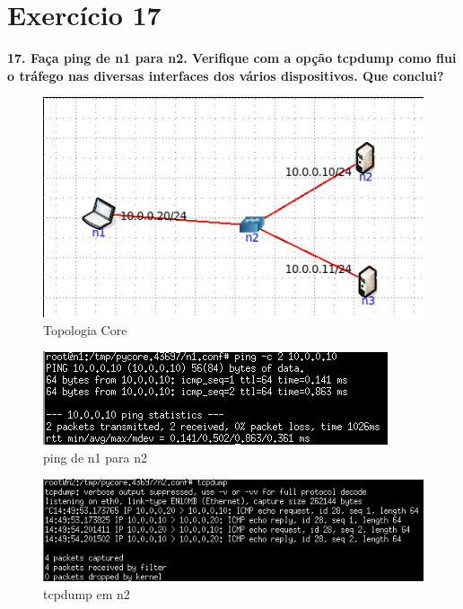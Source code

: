 \documentclass[a4paper]{report}
\begin{document}
\section{Exercício 17}
\textbf{17. Faça ping de n1 para n2. Verifique com a opção tcpdump como flui o
tráfego nas diversas interfaces dos vários dispositivos. Que conclui?}
\begin{figure}[H]
    \centering 
    \includegraphics[width=\textwidth]{images/ex17topologiacore.png}
    \caption{Topologia Core}
    \label{fig:ex17topologiacore}
\end{figure}

\begin{figure}[H]
    \centering 
    \includegraphics[width=\textwidth]{images/ex17ping.png}
    \caption{ping de n1 para n2}
    \label{fig:ex17ping}
\end{figure}

\begin{figure}[H]
    \centering 
    \includegraphics[width=\textwidth]{images/ex17tcpdumpn2.png}
    \caption{tcpdump em n2}
    \label{fig:ex17tcpdumpn2}
\end{figure}
\end{document}
